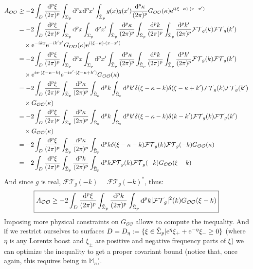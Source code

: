 \documentclass[a4paper,11pt]{article}
\numberwithin{equation}{section}
\theoremstyle{definition}
\renewcommand{\d}{{\mathrm{d}}}
\newcommand{\e}{{\mathrm{e}}}
\begin{document}
\begin{align*}
     A_{\mathcal{O}\mathcal{O}} &\geq -2 \int_D \frac{\d^p\xi}{(2\pi)^p}\int_{\Sigma_p}\d^px\d^px' \int_{\Tilde{\Sigma}_p}g(x)g(x')\frac{\d^p\kappa}{(2\pi)^p}G_{\mathcal{O}\mathcal{O}}(\kappa)\e^{i(\xi-\kappa)\cdot(x-x')}\\
     &=-2 \int_D \frac{\d^p\xi}{(2\pi)^p}\int_{\Sigma_p}\d^px\int_{\Sigma_p}\d^px' \int_{\Tilde{\Sigma}_p}\frac{\d^p\kappa}{(2\pi)^p}\int_{\Tilde{\Sigma}_p}\frac{\d^pk}{(2\pi)^p}\int_{\Tilde{\Sigma}_p}\frac{\d^pk'}{(2\pi)^p}\mathcal{FT}_g(k)\mathcal{FT}_g(k')\\&\quad \times \e^{-ikx}\e^{-ik'x'} G_{\mathcal{O}\mathcal{O}}(\kappa)\e^{i(\xi-\kappa)\cdot(x-x')}\\
     &=-2 \int_D \frac{\d^p\xi}{(2\pi)^p}\int_{\Sigma_p}\d^px\int_{\Sigma_p}\d^px' \int_{\Tilde{\Sigma}_p}\frac{\d^p\kappa}{(2\pi)^p}\int_{\Tilde{\Sigma}_p}\frac{\d^pk}{(2\pi)^p}\int_{\Tilde{\Sigma}_p}\frac{\d^pk'}{(2\pi)^p}\mathcal{FT}_g(k)\mathcal{FT}_g(k')\\&\quad \times \e^{ix\cdot(\xi-\kappa-k)}\e^{-ix'\cdot(\xi-\kappa+k')} G_{\mathcal{O}\mathcal{O}}(\kappa)\\
     &=-2 \int_D \frac{\d^p\xi}{(2\pi)^p} \int_{\Tilde{\Sigma}_p}\frac{\d^p\kappa}{(2\pi)^p}\int_{\Tilde{\Sigma}_p}\d^pk\int_{\Tilde{\Sigma}_p}\d^pk'\delta(\xi-\kappa-k)\delta(\xi-\kappa+k')\mathcal{FT}_g(k)\mathcal{FT}_g(k')\\&\quad \times G_{\mathcal{O}\mathcal{O}}(\kappa)\\
     &=-2 \int_D \frac{\d^p\xi}{(2\pi)^p} \int_{\Tilde{\Sigma}_p}\frac{\d^p\kappa}{(2\pi)^p}\int_{\Tilde{\Sigma}_p}\d^pk\int_{\Tilde{\Sigma}_p}\d^pk'\delta(\xi-\kappa-k)\delta(k-k')\mathcal{FT}_g(k)\mathcal{FT}_g(k')\\&\quad \times G_{\mathcal{O}\mathcal{O}}(\kappa)\\
     &=-2 \int_D \frac{\d^p\xi}{(2\pi)^p} \int_{\Tilde{\Sigma}_p}\frac{\d^p\kappa}{(2\pi)^p}\int_{\Tilde{\Sigma}_p}\d^pk\delta(\xi-\kappa-k)\mathcal{FT}_g(k)\mathcal{FT}_g(-k)G_{\mathcal{O}\mathcal{O}}(\kappa)\\
     &=-2 \int_D \frac{\d^p\xi}{(2\pi)^p} \int_{\Tilde{\Sigma}_p}\frac{\d^pk}{(2\pi)^p}\int_{\Tilde{\Sigma}_p}\d^pk\mathcal{FT}_g(k)\mathcal{FT}_g(-k)G_{\mathcal{O}\mathcal{O}}(\xi-k)
\end{align*}
And since $g$ is real, $\mathcal{FT}_g(-k)=\mathcal{FT}_g(-k)^*$, thus:
\begin{equation}
    \boxed{A_{\mathcal{O}\mathcal{O}} \geq -2 \int_D \frac{\d^p\xi}{(2\pi)^p} \int_{\Tilde{\Sigma}_p}\frac{\d^pk}{(2\pi)^p}\int_{\Tilde{\Sigma}_p}\d^pk |\mathcal{FT}_g|^2(k)G_{\mathcal{O}\mathcal{O}}(\xi-k)}
\end{equation}
Imposing more physical constraints on $G_{\mathcal{O}\mathcal{O}}$ allows to compute the inequality. And if we restrict ourselves to surfaces $D=D_\eta:=\{\xi\in\Tilde{\Sigma}_p | \e^\eta\xi_++\e^{-\eta}\xi_-\geq0\}$ (where $\eta$ is any Lorentz boost and $\xi_\pm$ are positive and negative frequency parts of $\xi$) we can optimize the inequality to get a proper covariant bound (notice that, once again, this requires being in $\mathbb{M}_n$).
\end{document}

